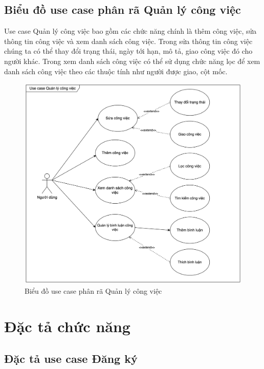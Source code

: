 \documentclass[../DoAn.tex]{subfiles}
\begin{document}
\subsection{Biểu đồ use case phân rã Quản lý công việc}
\label{subsection:2.2.5}
Use case Quản lý công việc bao gồm các chức năng chính là thêm công việc, sửa thông tin công việc và xem danh sách công việc.
Trong sửa thông tin công việc chúng ta có thể thay đổi trạng thái, ngày tới hạn, mô tả, giao công việc đó cho người khác.
Trong xem danh sách công việc có thể sử dụng chức năng lọc để xem danh sách công việc theo các thuộc tính như người được giao, cột mốc.
\begin{figure}[H]
    \centering
    \includegraphics[width=1.0\linewidth]{Hinhve/TaskUseCases.png}
    \caption{Biểu đồ use case phân rã Quản lý công việc}
    \label{fig:TaskUseCases}
\end{figure}
\newpage

\section{Đặc tả chức năng}
\label{section:2.3}

\subsection{Đặc tả use case Đăng ký}
\label{subsection:2.3.1}
\end{document}
